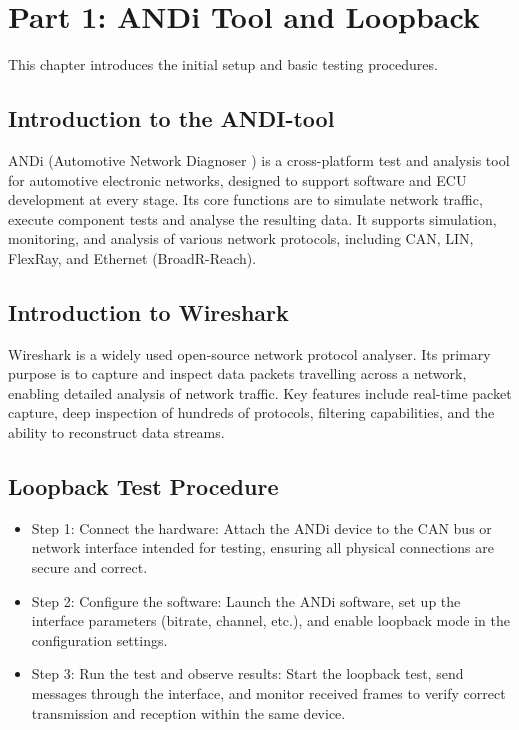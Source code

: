 \section{Part 1: ANDi Tool and Loopback}
\label{sec:andi-tool}

This chapter introduces the initial setup and basic testing procedures.

\subsection{Introduction to the ANDI-tool}
ANDi (Automotive Network Diagnoser ) is a cross-platform test and analysis tool for automotive electronic networks, designed to support software and ECU development at every stage. Its core functions are to simulate network traffic, execute component tests and analyse the resulting data\cite{technica}. It supports simulation, monitoring, and analysis of various network protocols, including CAN, LIN, FlexRay, and Ethernet (BroadR-Reach).

\subsection{Introduction to Wireshark}
Wireshark is a widely used open-source network protocol analyser. Its primary purpose is to capture and inspect data packets travelling across a network, enabling detailed analysis of network traffic. Key features include real-time packet capture, deep inspection of hundreds of protocols, filtering capabilities, and the ability to reconstruct data streams. 

\subsection{Loopback Test Procedure}
\begin{itemize}
    \item Step 1: Connect the hardware: Attach the ANDi device to the CAN bus or network interface intended for testing, ensuring all physical connections are secure and correct. 
    \item Step 2: Configure the software: Launch the ANDi software, set up the interface parameters (bitrate, channel, etc.), and enable loopback mode in the configuration settings. 
    \item Step 3: Run the test and observe results: Start the loopback test, send messages through the interface, and monitor received frames to verify correct transmission and reception within the same device. 
\end{itemize}

